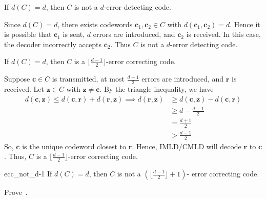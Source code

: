 \begin{Theorem}{}{}
    If $ d(C)=d $, then $ C $ is not a $ d $-error detecting code.
\end{Theorem}

\begin{Proof}{}{}
    Since $ d(C)=d $, there exists codewords $ \symbf{c}_1,\symbf{c}_2\in C $
    with $ d(\symbf{c}_1,\symbf{c}_2)=d $. Hence it is possible that
    $ \symbf{c}_1 $ is sent, $ d $ errors are introduced, and $ \symbf{c}_2 $
    is received. In this case, the decoder incorrectly accepts
    $ \symbf{c}_2 $. Thus $ C $ is not a $ d $-error detecting code.
\end{Proof}

\begin{Theorem}{}{}
    If $ d(C)=d $, then $ C $ is a $ \bigl\lfloor \frac{d-1}{2} \bigr\rfloor $-error
    correcting code.
\end{Theorem}

\begin{Proof}{}{}
    Suppose $ \symbf{c}\in C $ is transmitted, at most $ \frac{d-1}{2}  $ errors
    are introduced, and $ \symbf{r} $ is received.
    Let $ \symbf{z}\in C $ with $ \symbf{z}\neq \symbf{c} $.
    By the triangle inequality, we have
    \begin{align*}
        d(\symbf{c},\symbf{z})\leqslant d(\symbf{c},\symbf{r})+d(\symbf{r},\symbf{z})\implies
        d(\symbf{r},\symbf{z})
         & \geqslant d(\symbf{c},\symbf{z})-d(\symbf{c},\symbf{r}) \\
         & \geqslant d-\frac{d-1}{2}                   \\
         & =\frac{d+1}{2}                              \\
         & >\frac{d-1}{2}
    \end{align*}
    So, $ \symbf{c} $ is the unique codeword closest to $ \symbf{r} $. Hence, IMLD/CMLD
    will decode $ \symbf{r} $ to $ \symbf{c} $. Thus, $ C $ is a
    $ \bigl\lfloor \frac{d-1}{2} \bigr\rfloor $-error correcting code.
\end{Proof}

\begin{Theorem}{}{ecc_not_d-1}
    If $ d(C)=d $, then $ C $ is not a $ \left( \bigr\lfloor \frac{d-1}{2}\bigl\rfloor +1 \right) $-
    error correcting code.
\end{Theorem}

\begin{Exercise}{}{}
    Prove~.
\end{Exercise}


